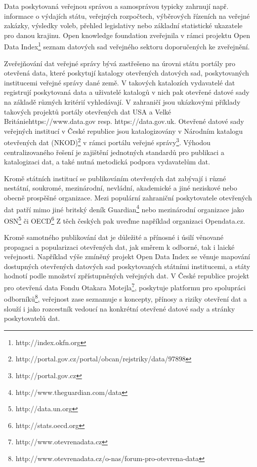 Data poskytovaná veřejnou správou a samosprávou typicky zahrnují např. informace o výdajích státu, veřejných rozpočtech, výběrových řízeních na veřejné zakázky, výsledky voleb, přehled legislativy nebo základní statistické ukazatele pro danou krajinu. Open knowledge foundation zveřejnila v rámci projektu Open Data Index\footnote{http://index.okfn.org} seznam datových sad veřejného sektoru doporučených ke zveřejnění.

Zveřejňování dat veřejné správy bývá zastřešeno na úrovni státu portály pro otevřená data, které poskytují katalogy otevřených datových sad, poskytovaných institucemi veřejné správy dané země. V takových katalozích vydavatelé dat registrují poskytovaná data a uživatelé katalogů v nich pak otevřené datové sady na základě různých kritérií vyhledávají. V zahraničí jsou ukázkovými příklady takových projektů portály otevřených dat USA a Velké Británie{https://www.data.gov resp. https://data.gov.uk}. Otevřené datové sady veřejných institucí v České republice jsou katalogizovány v Národním katalogu otevřených dat (NKOD)\footnote{http://portal.gov.cz/portal/obcan/rejstriky/data/97898} v rámci portálu veřejné správy\footnote{http://portal.gov.cz}. Výhodou centralizovaného řešení je zajištění jednotných standardů pro publikaci a katalogizaci dat, a také nutná metodická podpora vydavatelům dat.

Kromě státních institucí se publikováním otevřených dat zabývají i různé nestátní, soukromé, mezinárodní, nevládní, akademické a jiné neziskové nebo obecně prospěšné organizace. Mezi populární zahraniční poskytovatele otevřených dat patří mimo jiné britský deník Guardian\footnote{http://www.theguardian.com/data} nebo mezinárodní organizace jako OSN\footnote{http://data.un.org} či OECD\footnote{http://stats.oecd.org} Z těch českých pak uveďme například organizaci Opendata.cz.

Kromě samotného publikování dat je důležité a přínosné i úsilí věnované propagaci a popularizaci otevřených dat, jak směrem k odborné, tak i laické veřejnosti. Například výše zmíněný projekt Open Data Index se věnuje mapování dostupných otevřených datových sad poskytovaných státními institucemi, a státy hodnotí podle množství zpřístupněných veřejných dat. V České republice projekt pro otevřená data Fondu Otakara Motejla\footnote{http://www.otevrenadata.cz}, poskytuje platformu pro spolupráci odborníků\footnote{http://www.otevrenadata.cz/o-nas/forum-pro-otevrena-data}, veřejnost zase seznamuje s koncepty, přínosy a riziky otevření dat a slouží i jako rozcestník vedoucí na konkrétní otevřené datové sady a stránky poskytovatelů dat.

